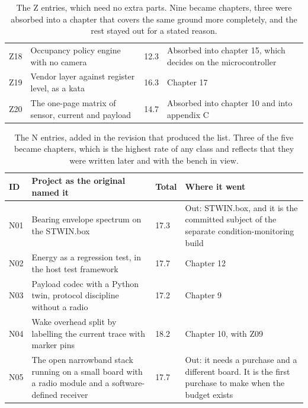 \begin{table}[H]
\begin{tabular}{p{9mm}p{70mm}p{11mm}p{55mm}}
Z18 & Occupancy policy engine with no camera & 12.3 & Absorbed into chapter 15, which decides on the microcontroller \\
Z19 & Vendor layer against register level, as a kata & 16.3 & Chapter 17 \\
Z20 & The one-page matrix of sensor, current and payload & 14.7 & Absorbed into chapter 10 and into appendix C \\
\bottomrule
\end{tabular}
\caption{The Z entries, which need no extra parts. Nine became chapters, three were absorbed into a chapter that covers the same ground more completely, and the rest stayed out for a stated reason.}
\end{table}

\begin{table}[H]\centering\small
\begin{tabular}{p{9mm}p{70mm}p{11mm}p{55mm}}
\toprule
ID & Project as the original named it & Total & Where it went \\
\midrule
N01 & Bearing envelope spectrum on the STWIN.box & 17.3 & Out: STWIN.box, and it is the committed subject of the separate condition-monitoring build \\
N02 & Energy as a regression test, in the host test framework & 17.7 & Chapter 12 \\
N03 & Payload codec with a Python twin, protocol discipline without a radio & 17.2 & Chapter 9 \\
N04 & Wake overhead split by labelling the current trace with marker pins & 18.2 & Chapter 10, with Z09 \\
N05 & The open narrowband stack running on a small board with a radio module and a software-defined receiver & 17.7 & Out: it needs a purchase and a different board. It is the first purchase to make when the budget exists \\
\bottomrule
\end{tabular}
\caption{The N entries, added in the revision that produced the list. Three of the five became chapters, which is the highest rate of any class and reflects that they were written later and with the bench in view.}
\end{table}

